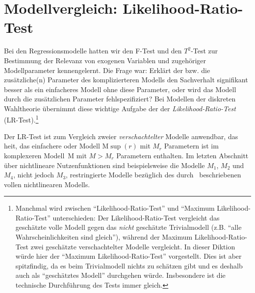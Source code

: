 

 
\section{\label{sec:LR}Modellvergleich: Likelihood-Ratio-Test}

\providecommand{\Mr}{\text{M}\sup{(r)}}

Bei den Regressionsmodelle hatten wir den F-Test und den $T^2$-Test zur Bestimmung der
Relevanz von exogenen Variablen und zugeh\"origer Modellparameter
kennengelernt. Die Frage war: Erkl\"art der bzw. die zus\"atzliche(n)
Parameter des komplizierteren Modells den Sachverhalt signifikant besser als 
ein einfacheres Modell ohne diese Parameter, oder wird das Modell
durch die zus\"atzlichen Parameter fehlspezifiziert? Bei 
Modellen der diskreten Wahltheorie \"ubernimmt diese wichtige Aufgabe
der   der
\emph{Likelihood-Ratio-Test} (LR-Test).\footnote{Manchmal wird zwischen
``Likelihood-Ratio-Test'' und ``Maximum Likelihood-Ratio-Test''
unterschieden: Der Likelihood-Ratio-Test vergleicht das gesch\"atzte
volle Modell
gegen das \emph{nicht} gesch\"atzte Trivialmodell (z.B. ``alle
Wahrscheinlichkeiten sind gleich''), w\"ahrend der Maximum
Likelihood-Ratio-Test zwei gesch\"atzte verschachtelter Modelle vergleicht.
In dieser Diktion w\"urde hier der ``Maximum Likelihood-Ratio-Test'' vorgestellt.
Dies ist aber spitzfindig, da es beim Trivialmodell nichts zu sch\"atzen
gibt und es deshalb auch als ``gesch\"atztes Modell'' durchgehen
w\"urde. Insbesondere ist die technische Durchf\"uhrung des Tests immer
gleich.}

Der LR-Test ist zum Vergleich zweier \emph{verschachtelter} Modelle
anwendbar, das hei\3t, das einfachere oder 
Modell $\Mr$ mit $M_r$ Parametern ist im komplexeren  Modell~M
 mit $M>M_r$ Parametern enthalten. Im letzten Abschnitt \"uber
 nichtlineare Nutzenfunktionen sind beispielsweise die Modelle $M_1$,
 $M_2$ und $M_4$, nicht jedoch $M_3$, restringierte Modelle bez\"uglich des
 durch~ beschriebenen vollen nichtlinearen Modells. 

